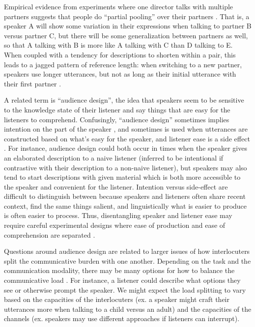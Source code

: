 \documentclass[]{article}
\begin{document}
Empirical evidence from experiments where one director talks with multiple partners suggests that people do ``partial pooling'' over their partners \citep{hawkins2021, yoon2014}. That is, a speaker A will show some variation in their expressions when talking to partner B versus partner C, but there will be some generalization between partners as well, so that A talking with B is more like A talking with C than D talking to E. When coupled with a tendency for descriptions to shorten within a pair, this leads to a jagged pattern of reference length: when switching to a new partner, speakers use longer utterances, but not as long as their initial utterance with their first partner \citep{yoon2019a}.  

A related term is ``audience design'', the idea that speakers seem to be sensitive to the knowledge state of their listener and say things that are easy for the listeners to comprehend. Confusingly, ``audience design'' sometimes implies intention on the part of the speaker \citep{horton2002a, horton2005}, and sometimes is used when utterances are constructed based on what's easy for the speaker, and listener ease is a side effect \citep{horton1996, rogers2013, macdonald2013}. For instance, audience design could both occur in times when the speaker gives an elaborated description to a naive listener (inferred to be intentional if contrastive with their description to a non-naive listener), but speakers may also tend to start descriptions with given material which is both more accessible to the speaker and convenient for the listener. 
  Intention versus side-effect are difficult to distinguish between because speakers and listeners often share recent context, find the same things salient, and linguistically what is easier to produce is often easier to process. Thus, disentangling speaker and listener ease may require careful experimental designs where ease of production and ease of comprehension are separated \citep{ferreira2004}. 
  
Questions around audience design are related to larger issues of how interlocuters split the communicative burden with one another. Depending on the task and the communication modality, there may be many options for how to balance the communicative load  \citep{clark1996, fay2010, foxtree2013}. For instance, a listener could describe what options they see or otherwise prompt the speaker. We might expect the load splitting to vary based on the capacities of the interlocuters (ex. a speaker might craft their utterances more when talking to a child versus an adult) and the capacities of the channels (ex. speakers may use different approaches if listeners can interrupt). 
\end{document}
